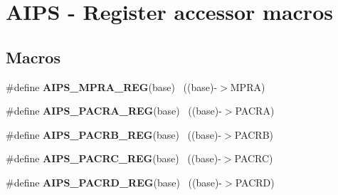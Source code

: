 \hypertarget{group___a_i_p_s___register___accessor___macros}{}\section{A\+I\+P\+S -\/ Register accessor macros}
\label{group___a_i_p_s___register___accessor___macros}
\subsection*{Macros}
\begin{DoxyCompactItemize}
\item 
\hypertarget{group___a_i_p_s___register___accessor___macros_ga152616308133cf4081eccd2218dcc92f}{}\#define {\bfseries A\+I\+P\+S\+\_\+\+M\+P\+R\+A\+\_\+\+R\+E\+G}(base)                                        ~((base)-\/$>$M\+P\+R\+A)\label{group___a_i_p_s___register___accessor___macros_ga152616308133cf4081eccd2218dcc92f}

\item 
\hypertarget{group___a_i_p_s___register___accessor___macros_ga34c1a4290c1592d146062320c02a9a6a}{}\#define {\bfseries A\+I\+P\+S\+\_\+\+P\+A\+C\+R\+A\+\_\+\+R\+E\+G}(base)                                      ~((base)-\/$>$P\+A\+C\+R\+A)\label{group___a_i_p_s___register___accessor___macros_ga34c1a4290c1592d146062320c02a9a6a}

\item 
\hypertarget{group___a_i_p_s___register___accessor___macros_ga9ef244a0063130484f0c49a3d504fc5b}{}\#define {\bfseries A\+I\+P\+S\+\_\+\+P\+A\+C\+R\+B\+\_\+\+R\+E\+G}(base)                                      ~((base)-\/$>$P\+A\+C\+R\+B)\label{group___a_i_p_s___register___accessor___macros_ga9ef244a0063130484f0c49a3d504fc5b}

\item 
\hypertarget{group___a_i_p_s___register___accessor___macros_ga78c7a08f917ec00d68544b8463bbb06b}{}\#define {\bfseries A\+I\+P\+S\+\_\+\+P\+A\+C\+R\+C\+\_\+\+R\+E\+G}(base)                                      ~((base)-\/$>$P\+A\+C\+R\+C)\label{group___a_i_p_s___register___accessor___macros_ga78c7a08f917ec00d68544b8463bbb06b}

\item 
\hypertarget{group___a_i_p_s___register___accessor___macros_ga60f95b6f529c1f86b3fa90f2dfabe604}{}\#define {\bfseries A\+I\+P\+S\+\_\+\+P\+A\+C\+R\+D\+\_\+\+R\+E\+G}(base)                                      ~((base)-\/$>$P\+A\+C\+R\+D)\label{group___a_i_p_s___register___accessor___macros_ga60f95b6f529c1f86b3fa90f2dfabe604}


\end{DoxyCompactItemize}

